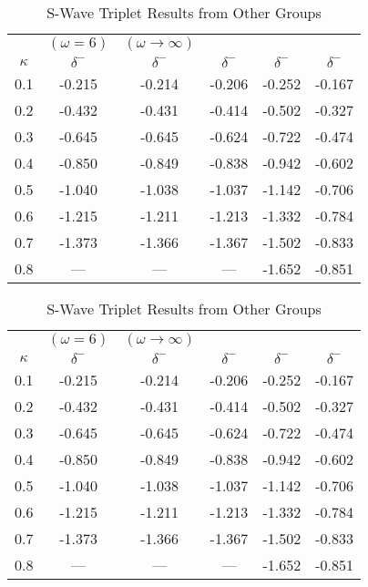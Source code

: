 \documentclass[Dissertation.tex]{subfiles}
\begin{document}
\begin{table}[H]
\begin{center}
\begin{tabular}{|c|c|c|c|c|c|}
\hline
 & $(\omega = 6)$ & $(\omega \rightarrow \infty)$ &  &  &   \\
$\kappa$ & $\delta^-$ \cite{VanReeth2003} & $\delta^-$ \cite{VanReeth2003} & $\delta^-$ \cite{Blackwood2002} & $\delta^-$ \cite{Ray1997} & $\delta^-$ \cite{Adhikari1999} \\
\hline
0.1 & -0.215 & -0.214 & -0.206 & -0.252 & -0.167 \\
0.2 & -0.432 & -0.431 & -0.414 & -0.502 & -0.327 \\
0.3 & -0.645 & -0.645 & -0.624 & -0.722 & -0.474 \\
0.4 & -0.850 & -0.849 & -0.838 & -0.942 & -0.602 \\
0.5 & -1.040 & -1.038 & -1.037 & -1.142 & -0.706 \\
0.6 & -1.215 & -1.211 & -1.213 & -1.332 & -0.784 \\
0.7 & -1.373 & -1.366 & -1.367 & -1.502 & -0.833 \\
0.8 &    --- &    --- &    --- & -1.652 & -0.851 \\
\hline
\end{tabular}
\caption{S-Wave Triplet Results from Other Groups}
\label{tab:SWaveTripletOther}
\end{center}
\end{table}


\begin{table}[H]
\begin{center}
\begin{tabular}{c c c c c c}
\toprule
 & $(\omega = 6)$ & $(\omega \rightarrow \infty)$ &  &  &   \\
$\kappa$ & $\delta^-$ \cite{VanReeth2003} & $\delta^-$ \cite{VanReeth2003} & $\delta^-$ \cite{Blackwood2002} & $\delta^-$ \cite{Ray1997} & $\delta^-$ \cite{Adhikari1999} \\
\midrule
0.1 & -0.215 & -0.214 & -0.206 & -0.252 & -0.167 \\
0.2 & -0.432 & -0.431 & -0.414 & -0.502 & -0.327 \\
0.3 & -0.645 & -0.645 & -0.624 & -0.722 & -0.474 \\
0.4 & -0.850 & -0.849 & -0.838 & -0.942 & -0.602 \\
0.5 & -1.040 & -1.038 & -1.037 & -1.142 & -0.706 \\
0.6 & -1.215 & -1.211 & -1.213 & -1.332 & -0.784 \\
0.7 & -1.373 & -1.366 & -1.367 & -1.502 & -0.833 \\
0.8 &    --- &    --- &    --- & -1.652 & -0.851 \\
\bottomrule
\end{tabular}
\caption{S-Wave Triplet Results from Other Groups}
\label{tab:SWaveTripletOther}
\end{center}
\end{table}
\end{document}
